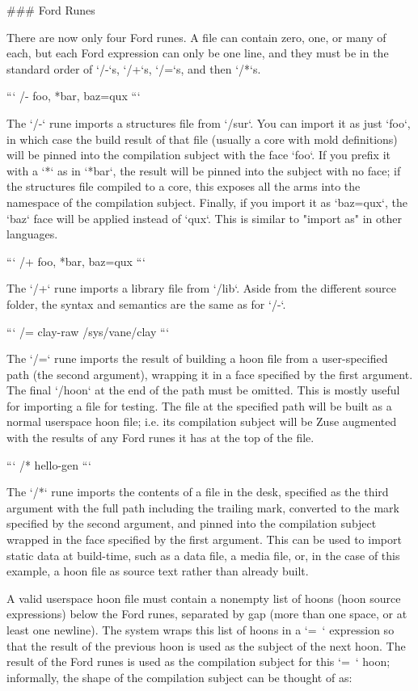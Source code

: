 \documentclass[twoside]{article}
\begin{document}
### Ford Runes

There are now only four Ford runes. A file can contain zero, one, or many of each, but each Ford expression can only be one line, and they must be in the standard order of `/-`s, `/+`s, `/=`s, and then `/*`s.

```
/-  foo, *bar, baz=qux
```

The `/-` rune imports a structures file from `/sur`. You can import it as just `foo`, in which case the build result of that file (usually a core with mold definitions) will be pinned into the compilation subject with the face `foo`. If you prefix it with a `*` as in `*bar`, the result will be pinned into the subject with no face; if the structures file compiled to a core, this exposes all the arms into the namespace of the compilation subject. Finally, if you import it as `baz=qux`, the `baz` face will be applied instead of `qux`. This is similar to "import as" in other languages.

```
/+  foo, *bar, baz=qux
```

The `/+` rune imports a library file from `/lib`. Aside from the different source folder, the syntax and semantics are the same as for `/-`.

```
/=  clay-raw  /sys/vane/clay
```

The `/=` rune imports the result of building a hoon file from a user-specified path (the second argument), wrapping it in a face specified by the first argument. The final `/hoon` at the end of the path must be omitted. This is mostly useful for importing a file for testing. The file at the specified path will be built as a normal userspace hoon file; i.e. its compilation subject will be Zuse augmented with the results of any Ford runes it has at the top of the file.

```
/*  hello-gen  %
```

The `/*` rune imports the contents of a file in the desk, specified as the third argument with the full path including the trailing mark, converted to the mark specified by the second argument, and pinned into the compilation subject wrapped in the face specified by the first argument. This can be used to import static data at build-time, such as a data file, a media file, or, in the case of this example, a hoon file as source text rather than already built.

A valid userspace hoon file must contain a nonempty list of hoons (hoon source expressions) below the Ford runes, separated by gap (more than one space, or at least one newline). The system wraps this list of hoons in a `=~` expression so that the result of the previous hoon is used as the subject of the next hoon. The result of the Ford runes is used as the compilation subject for this `=~` hoon; informally, the shape of the compilation subject can be thought of as:
\end{document}

